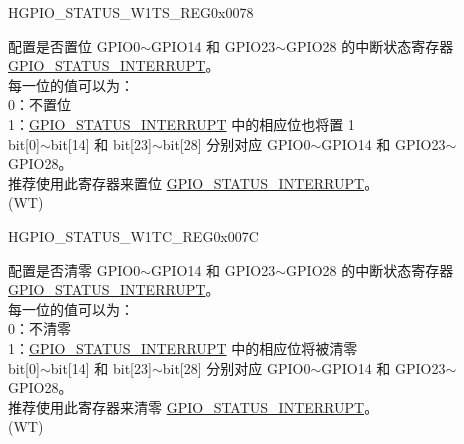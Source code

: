 \begin{register}{H}{GPIO\_STATUS\_W1TS\_REG}{0x0078}\label{regdesc:GPIOSTATUSW1TSREG}
%
\regnewline%
\begin{regdesc}\begin{reglist}
\label{fielddesc:GPIOSTATUSW1TS}\item [GPIO\_STATUS\_W1TS] 配置是否置位 GPIO0$\sim$GPIO14 和 GPIO23$\sim$GPIO28 的中断状态寄存器 \hyperref[fielddesc:GPIOSTATUSINTERRUPT]{GPIO\_STATUS\_INTERRUPT}。\\
每一位的值可以为：\\
0：不置位\\
1：\hyperref[fielddesc:GPIOSTATUSINTERRUPT]{GPIO\_STATUS\_INTERRUPT} 中的相应位也将置 1\\
bit[0]$\sim$bit[14] 和 bit[23]$\sim$bit[28] 分别对应 GPIO0$\sim$GPIO14 和 GPIO23$\sim$GPIO28。\\
推荐使用此寄存器来置位 \hyperref[fielddesc:GPIOSTATUSINTERRUPT]{GPIO\_STATUS\_INTERRUPT}。\\
 (WT)
\end{reglist}\end{regdesc}
\end{register}


\begin{register}{H}{GPIO\_STATUS\_W1TC\_REG}{0x007C}\label{regdesc:GPIOSTATUSW1TCREG}
%
\regnewline%
\begin{regdesc}\begin{reglist}
\label{fielddesc:GPIOSTATUSW1TC}\item [GPIO\_STATUS\_W1TC] 配置是否清零 GPIO0$\sim$GPIO14 和 GPIO23$\sim$GPIO28 的中断状态寄存器 \hyperref[fielddesc:GPIOSTATUSINTERRUPT]{GPIO\_STATUS\_INTERRUPT}。\\
每一位的值可以为：\\
0：不清零\\
1：\hyperref[fielddesc:GPIOSTATUSINTERRUPT]{GPIO\_STATUS\_INTERRUPT} 中的相应位将被清零\\
bit[0]$\sim$bit[14] 和 bit[23]$\sim$bit[28] 分别对应 GPIO0$\sim$GPIO14 和 GPIO23$\sim$GPIO28。\\
推荐使用此寄存器来清零 \hyperref[fielddesc:GPIOSTATUSINTERRUPT]{GPIO\_STATUS\_INTERRUPT}。\\
(WT)
\end{reglist}\end{regdesc}
\end{register}


